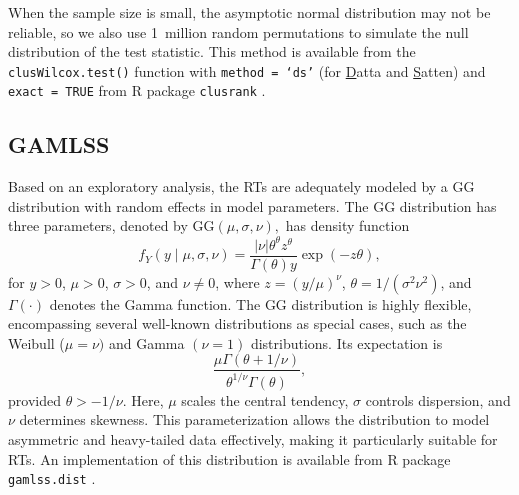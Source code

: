 \documentclass[12pt, letterpaper]{article}
\begin{document}
When the sample size is small, the asymptotic normal distribution may
not be reliable, so we also use 1~million random permutations to
simulate the null distribution of the test statistic.
This method is available from the \texttt{clusWilcox.test()} function
with \texttt{method = `ds'} (for \underline{D}atta and \underline{S}atten) and
\texttt{exact = TRUE} from R package
\texttt{clusrank} \citep{jiang2020wilcoxon}.


\subsection{GAMLSS}\label{sec:gamlss}

Based on an exploratory analysis, the RTs are adequately
modeled by a GG distribution with random effects in
model parameters. The GG distribution has three parameters, denoted by
$\text{GG}(\mu, \sigma, \nu),$ has density function
\begin{equation}
  \label{eq:gg}
f_Y(y \mid \mu, \sigma, \nu) =
\frac{|\nu| \theta^\theta z^{\theta}}{\Gamma(\theta) y}
\exp\left(-z \theta\right),
\end{equation}
for $y > 0$, $\mu > 0$, $\sigma > 0$, and $\nu \neq 0$,
where $z = (y / \mu)^\nu$,
$\theta = 1 / (\sigma^2 \nu^2)$, and
$\Gamma(\cdot)$ denotes the Gamma function.
The GG distribution is highly flexible, encompassing several
well-known distributions as special cases, such as the
Weibull ($\mu = \nu)$ and  Gamma $(\nu = 1)$ distributions.
Its expectation is
\[
  \frac{\mu \Gamma(\theta + 1 / \nu)}
  {\theta^{1 / \nu} \Gamma(\theta)},
\]
provided $\theta > -1 / \nu$. Here,
$\mu$ scales the central tendency, $\sigma$ controls
dispersion, and $\nu$ determines skewness. This parameterization allows
the distribution to model asymmetric and heavy-tailed data effectively, making
it particularly suitable for RTs.
An implementation of this distribution is available from R package
\texttt{gamlss.dist} \citep{rigby2019distributions}.
\end{document}
